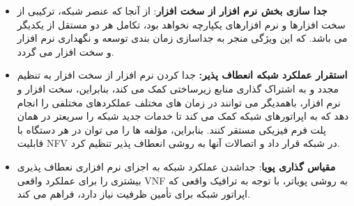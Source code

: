  \begin{itemize}
  \item \textbf{جدا سازی بخش نرم افزار از سخت افزار}:
از آنجا که عنصر شبکه، ترکیبی از سخت افزارها و نرم افزارهای یکپارچه نخواهد بود، تکامل هر دو مستقل از یکدیگر می باشد.
که این ویژگی منجر به جداسازی زمان بندی توسعه و نگهداری نرم افزار و سخت افزار می گردد.
\item \textbf{استقرار عملکرد شبکه انعطاف پذیر:}
جدا کردن نرم افزار از سخت افزار به تنظیم مجدد و به اشتراک گذاری منابع زیرساختی کمک می کند،
بنابراین، سخت افزار و نرم افزار، باهمدیگر
می توانند در زمان های مختلف عملکردهای مختلفی را انجام دهد که به اپراتورهای شبکه کمک می کند تا خدمات جدید شبکه را سریعتر در همان پلت فرم فیزیکی مستقر کنند.
بنابراین،
مؤلفه ها را می توان در هر دستگاه با قابلیت NFV در شبکه قرار داد و اتصالات آنها به روشی انعطاف پذیر تنظیم کرد.
\item \textbf{مقیاس گذاری پویا}:
  جداشدن عملکرد شبکه به اجزای نرم افزاری  نعطاف پذیری بیشتری را برای  عملکرد واقعی VNF به روشی پویاتر، 
   با توجه به ترافیک واقعی که اپراتور شبکه برای تأمین ظرفیت نیاز دارد،
  فراهم می کند.
\end{itemize}  
